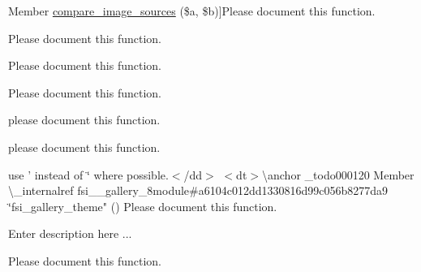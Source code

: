 \begin{DoxyRefList}
Member \hyperlink{cdm__dataportal_8descriptions_8theme_a240e3e12531ae51f9ccd831655d5df98}{compare\-\_\-image\-\_\-sources} (\$a, \$b)]Please document this function.  
\item[\label{todo__todo000176}%
\hypertarget{todo__todo000176}{}%
Member \hyperlink{cdm__dataportal_8name_8theme_ab7dc81cf086a42ecb7565d677e8ea613}{contains\-\_\-type\-\_\-designation} (\$element, \$collection)]Please document this function.  
\item[\label{todo__todo000114}%
\hypertarget{todo__todo000114}{}%
Member \hyperlink{ext__links_8module_a1a8f4cfbc2b4c51d154da1e241f7295a}{ext\-\_\-links\-\_\-permission} ()]Please document this function.  
\item[\label{todo__todo000117}%
\hypertarget{todo__todo000117}{}%
Member \hyperlink{ext__links_8module_af066e6db9ea192e7763c348f722d0dc4}{ext\-\_\-links\-\_\-theme} ()]Please document this function.  
\item[\label{todo__todo000105}%
\hypertarget{todo__todo000105}{}%
Member \hyperlink{class_footnote_ab0071956a83a038f780a32eddc24e48a}{Footnote\-:\-:do\-Render} ()]please document this function.  
\item[\label{todo__todo000106}%
\hypertarget{todo__todo000106}{}%
Member \hyperlink{class_footnote_key_a357ab1e964e2d23900a0a8e0a950a297}{Footnote\-Key\-:\-:\-\_\-\-\_\-construct} (\$key\-Str, \$footnote\-List\-Key)]please document this function.  
\item[\label{todo__todo000121}%
\hypertarget{todo__todo000121}{}%
Member \hyperlink{cdm__dataportal_8bibliography_8theme_ab5b351d4962395ea73e0b70070ac16e6}{format\-Reference\-\_\-for\-\_\-\-Bibliography} (\$references)]use ' instead of \char`\"{} where possible.$<$/dd$>$ $<$dt$>$\textbackslash{}anchor \-\_\-todo000120
\-Member \textbackslash{}\-\_\-internalref fsi\-\_\-\-\_\-gallery\-\_\-8module\#a6104c012dd1330816d99c056b8277da9 \char`\"{}fsi\-\_\-gallery\-\_\-theme" () Please document this function.  
\item[\label{todo__todo000007}%
\hypertarget{todo__todo000007}{}%
Member \hyperlink{cdm__dataportal_8module_aec4031172fa270d60139e31b20a26e88}{get\-\_\-image\-\_\-map} (\$width, \$bounding\-\_\-box=F\-A\-L\-S\-E, \$occurrence\-Query=F\-A\-L\-S\-E, \$distribution\-Query=F\-A\-L\-S\-E, \$legend\-Format\-Query=F\-A\-L\-S\-E, \$map\-\_\-caption=F\-A\-L\-S\-E)]Enter description here ... 
\item[\label{todo__todo000056}%
\hypertarget{todo__todo000056}{}%
Member \hyperlink{cdm__api_8module_a39a1b0bf19c9b70611e628214fd6bcd8}{get\-\_\-last\-\_\-taxon\-\_\-page\-\_\-tab} ()]Please document this function.  

\end{DoxyRefList}
